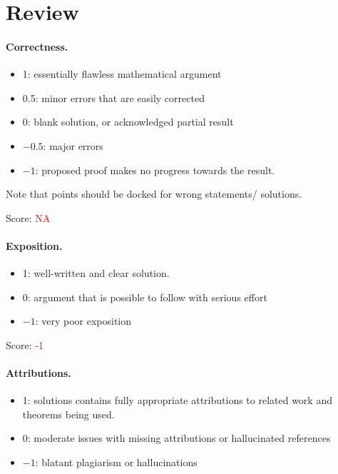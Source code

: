 \documentclass[11pt]{article}
\theoremstyle{remark}
\begin{document}
\maketitle

\section{Review}

\paragraph{Correctness.}
\begin{itemize}
	\item  1: essentially flawless mathematical argument
	\item  0.5: minor errors that are easily corrected
	\item  0: blank solution, or acknowledged partial result
	\item  $-0.5$: major errors
	\item  $-1$: proposed proof makes no progress towards the result.
\end{itemize}
Note that points should be docked for wrong statements/ solutions.

\noindent Score: \textcolor{red}{NA}

\paragraph{Exposition.}
\begin{itemize}
	\item  1: well-written and clear solution.
	\item  0: argument that is possible to follow with serious effort
	\item  $-1$: very poor exposition
\end{itemize}
\noindent Score: \textcolor{red}{-1}

\paragraph{Attributions.}
\begin{itemize}
	\item  1: solutions contains fully appropriate attributions
		to related work and theorems being used.
	\item  0: moderate issues with missing attributions or hallucinated references
	\item  $-1$: blatant plagiarism or hallucinations
\end{itemize}
\end{document}
